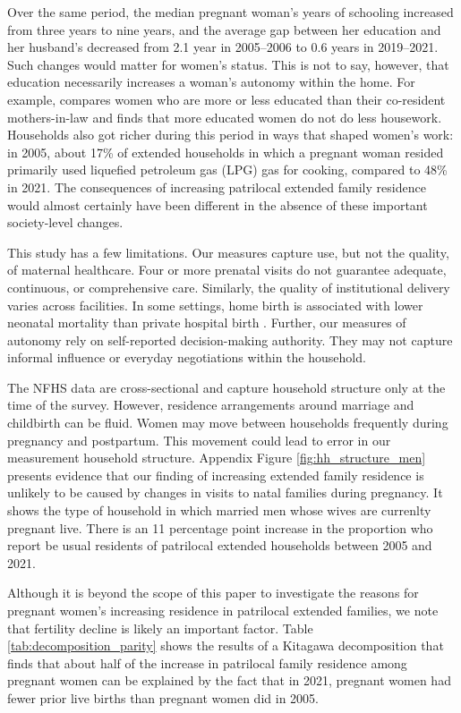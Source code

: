 \documentclass[10pt,twoside,reqno]{article}
\begin{document}
Over the same period, the median pregnant woman's years of schooling increased from three years to nine years, and the average gap between her education and her husband's decreased from 2.1 year in 2005--2006 to 0.6 years in 2019--2021.  Such changes would matter for women's status.  This is not to say, however, that education necessarily increases a woman's autonomy within the home.  For example, \cite{srivastava2020time} compares women who are more or less educated than their co-resident mothers-in-law and finds that more educated women do not do less housework.  Households also got richer during this period in ways that shaped women's work: in 2005, about 17\% of extended households in which a pregnant woman resided primarily used liquefied petroleum gas (LPG) gas  for cooking, compared to 48\% in 2021.  The consequences of increasing patrilocal extended family residence would almost certainly have been different in the absence of these important society-level changes.

This study has a few limitations. Our measures capture use, but not the quality, of maternal healthcare. Four or more prenatal visits do not guarantee adequate, continuous, or comprehensive care. Similarly, the quality of institutional delivery varies across facilities.  In some settings, home birth is associated with lower neonatal mortality than private hospital birth \citep{coffey2025excess}. Further, our measures of autonomy rely on self-reported decision-making authority. They may not capture informal influence or everyday negotiations within the household. 

The NFHS data are cross-sectional and capture household structure only at the time of the survey. However, residence arrangements around marriage and childbirth can be fluid. Women may move between households frequently during pregnancy and postpartum. This movement could lead to error in our measurement household structure.  Appendix Figure \ref{fig:hh_structure_men} presents evidence that our finding of increasing extended family residence is unlikely to be caused by changes in visits to natal families during pregnancy.  It shows the type of household in which married men whose wives are currenlty pregnant live.  There is an 11 percentage point increase in the proportion who report be usual residents of patrilocal extended households between 2005 and 2021.

Although it is beyond the scope of this paper to investigate the reasons for pregnant women's increasing residence in patrilocal extended families, we note that fertility decline is likely an important factor.  Table \ref{tab:decomposition_parity} shows the results of a Kitagawa decomposition that finds that about half of the increase in patrilocal family residence among pregnant women can be explained by the fact that in 2021, pregnant women had fewer prior live births than pregnant women did in 2005.  
\end{document}
